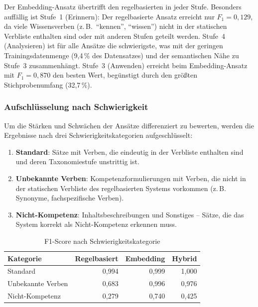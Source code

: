 Der Embedding-Ansatz übertrifft den regelbasierten in jeder Stufe.
Besonders auffällig ist Stufe~1 (Erinnern): Der regelbasierte Ansatz erreicht nur $F_1 = 0{,}129$, da viele Wissensverben (z.\,B.\ \enquote{kennen}, \enquote{wissen}) nicht in der statischen Verbliste enthalten sind oder mit anderen Stufen geteilt werden.
Stufe~4 (Analysieren) ist für alle Ansätze die schwierigste, was mit der geringen Trainingsdatenmenge (9{,}4\,\% des Datensatzes) und der semantischen Nähe zu Stufe~3 zusammenhängt.
Stufe~3 (Anwenden) erreicht beim Embedding-Ansatz mit $F_1 = 0{,}870$ den besten Wert, begünstigt durch den größten Stichprobenumfang (32{,}7\,\%).

\subsubsection{Aufschlüsselung nach Schwierigkeit}\label{sec:eval-schwierigkeit}

Um die Stärken und Schwächen der Ansätze differenziert zu bewerten, werden die Ergebnisse nach drei Schwierigkeitskategorien aufgeschlüsselt:

\begin{enumerate}
  \item \textbf{Standard}: Sätze mit Verben, die eindeutig in der Verbliste enthalten sind und deren Taxonomiestufe unstrittig ist.
  \item \textbf{Unbekannte Verben}: Kompetenzformulierungen mit Verben, die nicht in der statischen Verbliste des regelbasierten Systems vorkommen (z.\,B. Synonyme, fachspezifische Verben).
  \item \textbf{Nicht-Kompetenz}: Inhaltsbeschreibungen und Sonstiges -- Sätze, die das System korrekt als Nicht-Kompetenz erkennen muss.
\end{enumerate}

\begin{table}[H]
\caption{F1-Score nach Schwierigkeitskategorie\label{tab:eval-schwierigkeit}}
\centering
\begin{tabular}{lrrr}
\hline
\textbf{Kategorie} & \textbf{Regelbasiert} & \textbf{Embedding} & \textbf{Hybrid} \\
\hline
Standard & 0{,}994 & 0{,}999 & 1{,}000 \\
Unbekannte Verben & 0{,}683 & 0{,}996 & 0{,}976 \\
Nicht-Kompetenz & 0{,}279 & 0{,}740 & 0{,}425 \\
\hline
\end{tabular}
\end{table}

